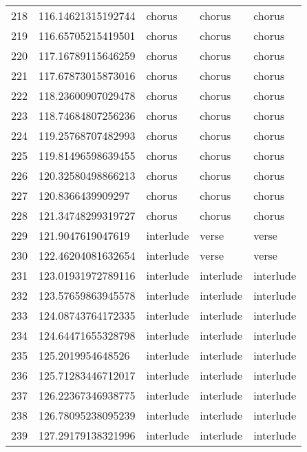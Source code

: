 \begin{table}[]
\begin{tabular}{lllll}
    218  & 116.14621315192744 & chorus       & chorus          & chorus         \\
    219  & 116.65705215419501 & chorus       & chorus          & chorus         \\
    220  & 117.16789115646259 & chorus       & chorus          & chorus         \\
    221  & 117.67873015873016 & chorus       & chorus          & chorus         \\
    222  & 118.23600907029478 & chorus       & chorus          & chorus         \\
    223  & 118.74684807256236 & chorus       & chorus          & chorus         \\
    224  & 119.25768707482993 & chorus       & chorus          & chorus         \\
    225  & 119.81496598639455 & chorus       & chorus          & chorus         \\
    226  & 120.32580498866213 & chorus       & chorus          & chorus         \\
    227  & 120.8366439909297  & chorus       & chorus          & chorus         \\
    228  & 121.34748299319727 & chorus       & chorus          & chorus         \\
    229  & 121.9047619047619  & interlude    & verse           & verse          \\
    230  & 122.46204081632654 & interlude    & verse           & verse          \\
    231  & 123.01931972789116 & interlude    & interlude       & interlude      \\
    232  & 123.57659863945578 & interlude    & interlude       & interlude      \\
    233  & 124.08743764172335 & interlude    & interlude       & interlude      \\
    234  & 124.64471655328798 & interlude    & interlude       & interlude      \\
    235  & 125.2019954648526  & interlude    & interlude       & interlude      \\
    236  & 125.71283446712017 & interlude    & interlude       & interlude      \\
    237  & 126.22367346938775 & interlude    & interlude       & interlude      \\
    238  & 126.78095238095239 & interlude    & interlude       & interlude      \\
    239  & 127.29179138321996 & interlude    & interlude       & interlude      \\

\end{tabular}
\end{table}
